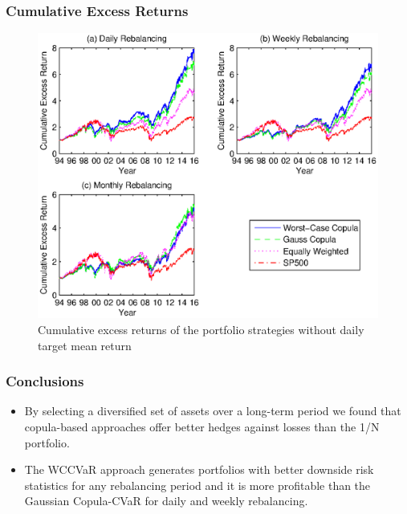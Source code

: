 \documentclass[pdf,10pt,xcolor=dvipsnames,hide notes]{beamer}
\begin{document}
\begin{frame}[label=frame10]
\frametitle{Cumulative Excess Returns}

\begin{figure}[htbp]
\centering
\includegraphics[scale=0.55]{fig1_nogrid.eps}
\caption{\scriptsize Cumulative excess returns of the portfolio strategies without daily target mean return }
\label{fig:fig01}
\end{figure}

\end{frame}

\begin{frame}[label=frame9d]
	\frametitle{Conclusions}
	
	\begin{itemize}
		\justifying
		\setlength{\parskip}{15pt}
		
		\item By selecting a diversified set of assets over a long-term period we found that copula-based approaches offer better hedges against losses than the 1/N portfolio.
		
		\item The WCCVaR approach generates portfolios with better downside risk statistics for any rebalancing period and it is more profitable than the Gaussian Copula-CVaR for daily and weekly rebalancing. 
		
		\end{itemize}
	
\end{frame}
		
\end{document}
